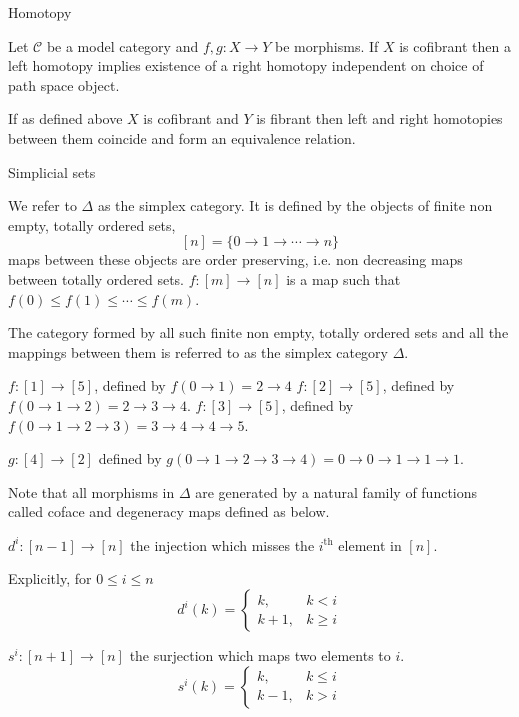 \documentclass[10pt]{beamer}
\begin{document}
\begin{frame}{Homotopy}
	\begin{lemma}
		Let $\mathcal{C}$ be a model category and $f,g : X \to Y$ be morphisms. If $X$ is cofibrant then a left homotopy implies existence of a right homotopy independent on choice of path space object.
	\end{lemma}
	
	\begin{corollary}
		If as defined above $X$ is cofibrant and $Y$ is fibrant then left and right homotopies between them coincide and form an equivalence relation.
	\end{corollary}
\end{frame}

\begin{frame}{Simplicial sets}
		\begin{definition}
		We refer to $\Delta$ as the simplex category. It is defined by the objects of finite non empty, totally ordered sets,
		\[ [n]=\{0 \to 1 \to \cdots \to n\} \]
		maps between these objects are order preserving, i.e. non decreasing maps between totally ordered sets.
		$f: [m] \to [n]$ is a map such that $f(0) \leq f(1) \leq \cdots \leq f(m)$.
		
		The category formed by all such finite non empty, totally ordered sets and all the mappings between them is referred to as the simplex category $\Delta$.
	\end{definition}
	
		\begin{example}
		\( f:[1]\to[5] \), defined by \( f(0 \to 1)= 2 \to 4 \)
		$f:[2] \to [5]$, defined by $f(0 \to 1 \to 2) = 2 \to 3 \to 4$.
		\( f:[3] \to [5] \), defined by \( f(0 \to 1 \to 2 \to 3)=3 \to 4 \to 4 \to 5 \).
		
	\end{example}	
	\begin{example}
		
		$g:[4] \to [2]$ defined by $g(0 \to 1 \to 2\to 3 \to 4) = 0\to 0 \to 1 \to 1 \to 1.$		
	\end{example}
	
	Note that all morphisms in $\Delta$ are generated by a natural family of functions called coface and degeneracy maps defined as below.
	\begin{definition}
		$d^i:[n-1] \to [n]$ the injection which misses the $i^\mathrm{th}$ element in $[n]$.
		
		Explicitly, for $0 \leq i \leq n$
		\[
		d^i(k) =
		\begin{cases}
			k, & k < i \\
			k + 1, & k \geq i
		\end{cases}
		\]
	\end{definition}
	\begin{definition}
		$s^i:[n+1]\to[n]$ the surjection which maps two elements to $i$.
		\[
		s^i(k) =
		\begin{cases}
			k, & k \leq i \\
			k - 1, & k > i
		\end{cases}
		\]
	\end{definition}
	

\end{frame}
\end{document}
